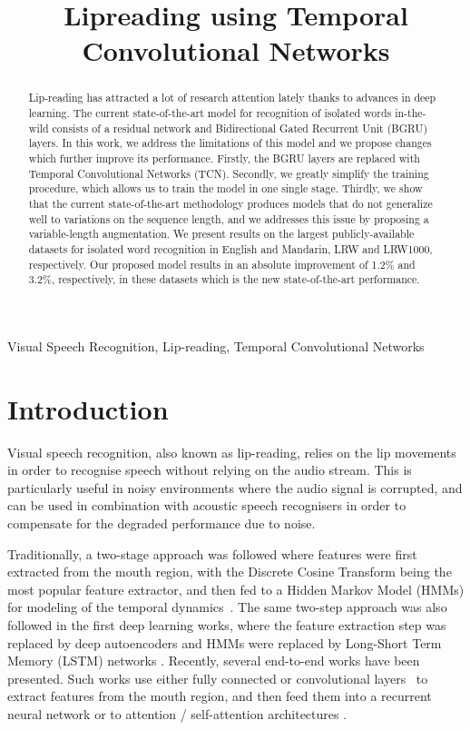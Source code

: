 \documentclass{article}
\title{Lipreading using Temporal Convolutional Networks}
\begin{document}
\maketitle
\begin{abstract}
Lip-reading has attracted a lot of research attention lately thanks to advances in deep learning. The current state-of-the-art model for recognition of isolated words in-the-wild consists of a residual network and  Bidirectional Gated Recurrent Unit (BGRU) layers. In this work, we address the limitations of this model and we propose changes which further improve its performance. Firstly, the BGRU layers are replaced with Temporal Convolutional Networks (TCN). Secondly, we greatly simplify the training procedure, which allows us to train the model in one single stage. Thirdly, we show that the current state-of-the-art methodology produces models that do not generalize well to variations on the sequence length, and we addresses this issue by proposing a variable-length augmentation. We present results on the largest publicly-available datasets for isolated word recognition in English and Mandarin, LRW and LRW1000, respectively. Our proposed model results in an absolute improvement of 1.2\% and 3.2\%, respectively, in these datasets which is the new state-of-the-art performance.
\end{abstract}


\begin{keywords}
Visual Speech Recognition, Lip-reading, Temporal Convolutional Networks
\end{keywords}
\section{Introduction}
\label{sec:intro}

Visual speech recognition, also known as lip-reading, relies on the lip movements in order to recognise speech without relying on the audio stream. This is particularly useful in noisy environments where the audio signal is corrupted, and can be used in combination with acoustic speech recognisers in order to compensate for the degraded performance due to noise. 

Traditionally, a two-stage approach was followed where features were first extracted from the mouth region, with the Discrete Cosine Transform being the most popular feature extractor, and then fed to a Hidden Markov Model (HMMs) for modeling of the temporal dynamics~\cite{Potamianos2003,Dupont2000,zhou14}. The same two-step approach was also followed in the first deep learning works, where the feature extraction step was replaced by deep autoencoders and HMMs were replaced by Long-Short Term Memory (LSTM) networks \cite{noda2015audio,petridis16,Li2016}. Recently, several end-to-end works have been presented. Such works use either fully connected \cite{petridis2017deepVisualSpeech,wand16, petridis2017end} or convolutional layers~\cite{stafylakis17, shillingford2018large, afouras2018deep, chung16b} to extract features from the mouth region, and then feed them into a recurrent neural network or to attention \cite{chung16b,petridis2018audio} / self-attention architectures \cite{afouras2018deep}. 
\end{document}
